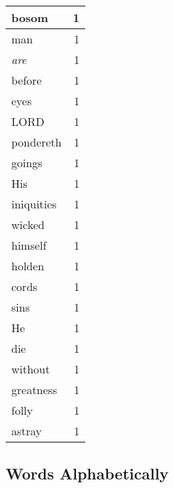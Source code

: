 \begin{center}
\begin{longtable}{l|r}
bosom & 1\\ \hline 
man & 1\\ \hline 
\emph{are} & 1\\ \hline 
before & 1\\ \hline 
eyes & 1\\ \hline 
LORD & 1\\ \hline 
pondereth & 1\\ \hline 
goings & 1\\ \hline 
His & 1\\ \hline 
iniquities & 1\\ \hline 
wicked & 1\\ \hline 
himself & 1\\ \hline 
holden & 1\\ \hline 
cords & 1\\ \hline 
sins & 1\\ \hline 
He & 1\\ \hline 
die & 1\\ \hline 
without & 1\\ \hline 
greatness & 1\\ \hline 
folly & 1\\ \hline 
astray & 1\\ \hline 
\end{longtable}  
\end{center}  


  
\normalsize  

  
  


\subsection{Words Alphabetically}

